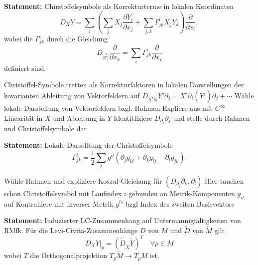 \documentclass[10pt, letterpaper]{article}
\begin{document}
\vspace{0.8cm}

\textbf{Statement: }{Chirstoffelsymbole als Korrekturterme in lokalen Koordinaten}
$$
D_{X} Y=\sum_{i}\left(\sum_{j} X_{j} \frac{\partial Y_{i}}{\partial x_{j}}+\sum_{j, k} \Gamma_{j k}^{i} X_{j} Y_{k}\right) \frac{\partial}{\partial x_{i}},
$$
wobei die $\Gamma_{j k}^{i}$ durch die Gleichung
$$
D_{\frac{\partial}{\partial x_{j}}} \frac{\partial}{\partial x_{k}}=\sum_{i} \Gamma_{j k}^{i} \frac{\partial}{\partial x_{i}}
$$
definiert sind.

\StructurePic{}{}
{%
\begin{outline}
  Christoffel-Symbole tretten als Korrekturfaktoren in lokalen Darstellungen der kovarianten Ableitung von Vektorfeldern auf $D_{X^i\partial_i}Y^j\partial_j=X^i\partial_i(Y^j)\partial_j+\cdots$
  \1 Wähle lokale Darstellung von Vektorfeldern bzgl. Rahmen
  \1 Expliere aus mit $C^\infty$-Linearität in $X$ und Ableitung in $Y$
  \1 Identitfiziere $D_{\partial_i}\partial_j$ und stelle durch Rahmen und Christoffelsymbole dar
\end{outline}
}

\vspace{0.5cm}


\textbf{Statement: } Lokale Darselltung der Christoffelsymbole
$$
\Gamma_{j k}^{i}=\frac{1}{2} \sum_{l} g^{i l}\left(\partial_{j} g_{k l}+\partial_{k} g_{l j}-\partial_{l} g_{j k}\right) .
$$

\StructurePic{}{}
{%
\begin{outline}
  \1 Wähle Rahmen und expliziere Koszul-Gleichung für $(D_{\partial_j}\partial_k,\partial_l)$
  \2 Hier tauchen schon Christoffelsymbol mit Laufindex $i$ gebunden an Metrik-Komponenten $g_{il}$ auf
  \1 Kontrahiere mit inverser Metrik $g^{ls}$ bzgl Index des zweiten Basisvektors
\end{outline}
}

\vspace{0.8cm}

\textbf{Statement: } {Induzierter LC-Zusammenhang auf Untermannigfaltigkeiten von RMfk}. 
Für die Levi-Civita-Zusammenhänge $D$ von $M$ und $\tilde{D}$ von $\tilde{M}$ gilt
\begin{equation*}
\left.D_{X} Y\right|_{p}=\left(\tilde{D}_{\tilde{X}} \tilde{Y}\right)^{T} \quad \forall p \in M 
\end{equation*}
wobei $T$ die Orthogonalprojektion $T_{p} \tilde{M} \rightarrow T_{p} M$ ist.
\end{document}
